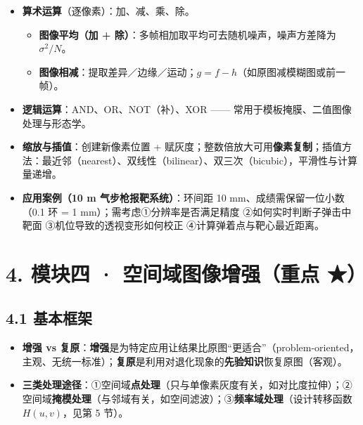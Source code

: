 \begin{itemize}
\begin{itemize}
\item \textbf{路径}：4 路径 / 8 路径 / m 路径（连续像素的序列）。
\item \textbf{连通集}：只含一个连通分量；\textbf{区域}是连通集；\textbf{边界}：区域中至少有一个邻点不在该区域内的像素集合。
\end{itemize}
\item \textbf{算术运算}（逐像素）：加、减、乘、除。
\begin{itemize}
\item \textbf{图像平均（加 + 除）}：多帧相加取平均可去随机噪声，噪声方差降为 $\sigma^2/N$。
\item \textbf{图像相减}：提取差异／边缘／运动；$g=f-h$（如原图减模糊图或前一帧）。
\end{itemize}
\item \textbf{逻辑运算}：AND、OR、NOT（补）、XOR —— 常用于模板掩膜、二值图像处理与形态学。
\item \textbf{缩放与插值}：创建新像素位置 + 赋灰度；整数倍放大可用\textbf{像素复制}；插值方法：最近邻（nearest）、双线性（bilinear）、双三次（bicubic），平滑性与计算量递增。
\item \textbf{应用案例（10 m 气步枪报靶系统）}：环间距 10 mm、成绩需保留一位小数（0.1 环 = 1 mm）；需考虑①分辨率是否满足精度 ②如何实时判断子弹击中靶面 ③机位导致的透视变形如何校正 ④计算弹着点与靶心最近距离。
\end{itemize}
\section*{4. 模块四 · 空间域图像增强（重点 ★）}
\subsection*{4.1 基本框架}
\begin{itemize}
\item \textbf{增强 vs 复原}：\textbf{增强}是为特定应用让结果比原图“更适合”（problem-oriented，主观、无统一标准）；\textbf{复原}是利用对退化现象的\textbf{先验知识}恢复原图（客观）。
\item \textbf{三类处理途径}：①空间域\textbf{点处理}（只与单像素灰度有关，如对比度拉伸）；②空间域\textbf{掩模处理}（与邻域有关，如空间滤波）；③\textbf{频率域处理}（设计转移函数 $H(u,v)$，见第 5 节）。
\end{itemize}
